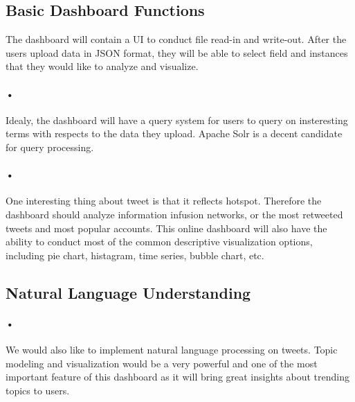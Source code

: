 \documentclass{article} %
\begin{document}
\subsection{Basic Dashboard Functions}
The dashboard will contain a UI to conduct file read-in and write-out. After the users upload data in JSON format, they will be able to select field and instances that they would like to analyze and visualize.
\paragraph{•}
Idealy, the dashboard will have a query system for users to query on insteresting terms with respects to the data they upload. Apache Solr is a decent candidate for query processing.
\paragraph{•}
One interesting thing about tweet is that it reflects hotspot. Therefore the dashboard should analyze information infusion networks, or the most retweeted tweets and most popular accounts. This online dashboard will also have the ability to conduct most of the common descriptive visualization options, including pie chart, histagram, time series, bubble chart, etc.

\subsection{Natural Language Understanding}
\paragraph{•}
We would also like to implement natural language processing on tweets. Topic modeling and visualization would be a very powerful and one of the most important feature of this dashboard as it will bring great insights about trending topics to users.
\end{document}
